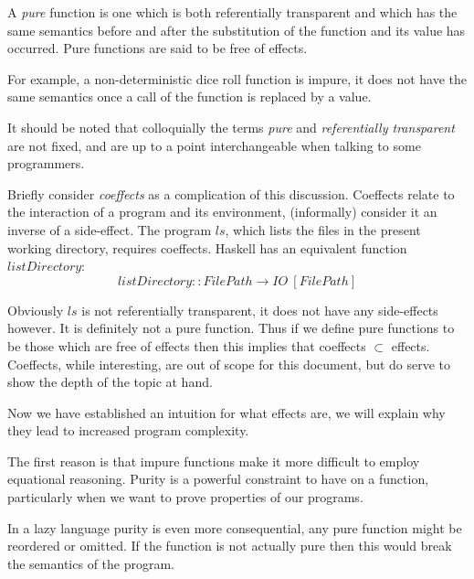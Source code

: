\begin{definition}
    A \textit{pure} function is one which is both
    referentially transparent and which has the same semantics
    before and after the substitution of the function and its value
    has occurred. Pure functions are said to be free of effects.

    For example,
    a non-deterministic dice roll function is impure,
    it does not have the same semantics
    once a call of the function is replaced by a value.
\end{definition}

It should be noted that colloquially
the terms \textit{pure} and \textit{referentially transparent} are not fixed,
and are up to a point interchangeable when talking to some programmers.

Briefly consider \textit{coeffects} as a complication of this discussion.
Coeffects relate to the interaction of a program and its environment\cite{petricek2014coeffects},
(informally) consider it an inverse of a side-effect.
The program $ls$, which lists the files in the present working directory,
requires coeffects.
Haskell has an equivalent function $listDirectory$:
\begin{equation}
    listDirectory :: FilePath \rightarrow IO\ [FilePath]
\end{equation}

Obviously $ls$ is not referentially transparent,
it does not have any side-effects however.
It is definitely not a pure function.
Thus if we define pure functions to be those
which are free of effects then this
implies that coeffects $\subset$ effects.
Coeffects, while interesting, are out of scope for this document,
but do serve to show the depth of the topic at hand.

Now we have established an intuition for what effects are,
we will explain why they lead to increased program complexity.

The first reason is that impure functions make it more
difficult to employ equational reasoning.
Purity is a powerful constraint to have on a function,
particularly when we want to prove properties of
our programs\cite{backus2007can}.

In a lazy language purity is even more consequential,
any pure function might be reordered or omitted.
If the function is not actually pure then this would
break the semantics of the program.

